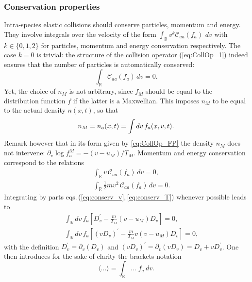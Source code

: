 \documentclass[11pt]{article}
\begin{document}
\subsubsection{Conservation properties}\label{sub:cons_ppy}
Intra-species elastic collisions should conserve particles, momentum and energy. 
They involve integrals over the velocity of the form $\int_{\mathbb{R}} v^k \mathcal{C}_{aa}(f_a) \, \,d v$ with $k\in\{0,1,2\}$ for particles, momentum and energy conservation respectively. The case $k=0$ is trivial: the structure of the collision operator (\ref{eq:CollOp_1}) indeed ensures that the number of particles is automatically conserved:
%
\begin{equation} \label{eq:conserv_n}
\int_{\mathbb{R}} \mathcal{C}_{aa}(f_a) \,dv = 0.
\end{equation}
%
Yet, the choice of $n_M$ is not arbitrary, since $f_M$ should be equal to the distribution function $f$ if the latter is a Maxwellian. This imposes $n_M$ to be equal to the actual density $n(x,t)$, so that
%
\begin{equation} \label{eq:def_nM}
n_M = n_a(x,t) = \int dv \, f_a(x,v,t).\\
\end{equation}
%
Remark however that in its form given by \cref{eq:CollOp_FP} the density $n_M$ does not intervene: $\partial_{v}\operatorname{log} f_a^{M} = -(v-u_M)/T_M$. Momentum and energy conservation correspond to the relations
%
\begin{eqnarray}
&& \int_{\mathbb{R}} v\, \mathcal{C}_{aa}(f_a) \,d v = 0 \label{eq:conserv_v}, \\
&& \int_{\mathbb{R}} \frac{1}{2}mv^2\, \mathcal{C}_{aa}(f_a) \,d v = 0 \label{eq:conserv_T}.
\end{eqnarray}
%
Integrating by parts eqs.\,(\ref{eq:conserv_v},\,\ref{eq:conserv_T}) whenever possible
leads to
%
\begin{eqnarray}
&&  \int_{\mathbb{R}} d v\, f_a\left[ 
D_v^\prime - \frac{m}{T_M} (v-u_M)D_v \right] = 0 \label{eq:conserv_v2}, \\
&& \int_{\mathbb{R}} d v\, f_a\left[ 
(vD_v)^\prime - \frac{m}{T_M} v(v-u_M)D_v \right] = 0 \label{eq:conserv_T2},
\end{eqnarray}
%
with the definition $D_v^\prime = \partial_v (D_v)$ and $(vD_v)^\prime = \partial_v (vD_v) = D_v + vD_v^\prime$. 
One then introduces for the sake of clarity the brackets notation
%
\begin{equation*}
\langle ... \rangle = \int_{\mathbb{R}} ... \; f_a \, dv.
\end{equation*}
\end{document}
